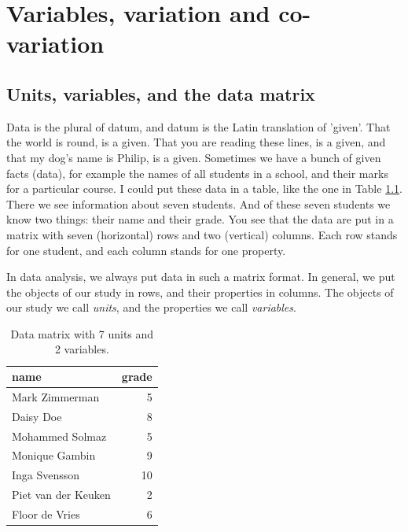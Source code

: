 \documentclass[]{book}\usepackage[]{graphicx}\usepackage[]{color}
\begin{document}
\tableofcontents



\mainmatter
\pagestyle{plain}

\chapter{Variables, variation and co-variation} \label{chap:intro}


\section{Units, variables, and the data matrix}



Data is the plural of datum, and datum is the Latin translation of 'given'. That the world is round, is a given. That you are reading these lines, is a given, and that my dog's name is Philip, is a given. Sometimes we have a bunch of given facts (data), for example the names of all students in a school, and their marks for a particular course. I could put these data in a table, like the one in Table \ref{tab:data_1}. There we see information about seven students. And of these seven students we know two things: their name and their grade. You see that the data are put in a matrix with seven (horizontal) rows and two (vertical) columns. Each row stands for one student, and each column stands for one property.

In data analysis, we always put data in such a matrix format. In general, we put the objects of our study in rows, and their properties in columns. The objects of our study we call \textit{units}, and the properties we call \textit{variables}.

\begin{table}[ht]
\centering
\caption{Data matrix with 7 units and 2 variables.} 
\label{tab:data_1}
\begin{tabular}{lr}
  \hline
name & grade \\ 
  \hline
Mark Zimmerman & 5 \\ 
  Daisy Doe & 8 \\ 
  Mohammed Solmaz & 5 \\ 
  Monique Gambin & 9 \\ 
  Inga Svensson & 10 \\ 
  Piet van der Keuken & 2 \\ 
  Floor de Vries & 6 \\ 
   \hline
\end{tabular}
\end{table}
\end{document}
